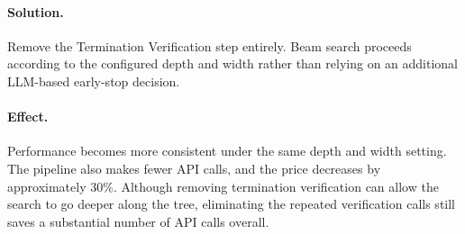 \documentclass[11pt]{article}
\begin{document}
\paragraph{Solution.}
Remove the Termination Verification step entirely. Beam search proceeds according to the configured depth and width rather than relying on an additional LLM-based early-stop decision.

\paragraph{Effect.}
Performance becomes more consistent under the same depth and width setting. The pipeline also makes fewer API calls, and the price decreases by approximately 30\%. Although removing termination verification can allow the search to go deeper along the tree, eliminating the repeated verification calls still saves a substantial number of API calls overall.
\end{document}
